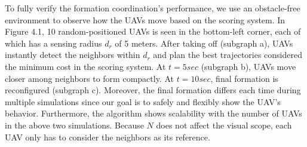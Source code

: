 To fully verify the formation coordination's performance, we use an obstacle-free environment to observe how the UAVs move based on the scoring system. In Figure 4.1, 10 random-positioned UAVs is seen in the bottom-left corner, each of which has a sensing radius $d_{r}$ of 5 meters. After taking off (subgraph a), UAVs instantly detect the neighbors within $d_{r}$ and plan the best trajectories considered the minimum cost in the scoring system. At $t= 5 sec$ (subgraph b), UAVs move closer among neighbors to form compactly. At $t= 10 sec$, final formation is reconfigured (subgraph c). 
Moreover, the final formation differs each time during multiple simulations since our goal is to safely and flexibly show the UAV's behavior. Furthermore, the algorithm shows scalability with the number of UAVs in the above two simulations. Because $N$ does not affect the visual scope, each UAV only has to consider the neighbors as its reference. 


